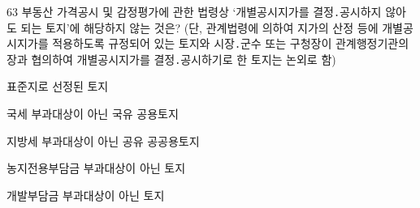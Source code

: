 \begin{question}{63}
부동산 가격공시 및 감정평가에 관한 법령상 ‘개별공시지가를 결정․공시하지 않아도 되는 토지’에 해당하지 않는 것은? (단, 관계법령에 의하여 지가의 산정 등에 개별공시지가를 적용하도록 규정되어 있는 토지와 시장․군수 또는 구청장이 관계행정기관의 장과 협의하여 개별공시지가를 결정․공시하기로 한 토지는 논외로 함)
\begin{choices}
  \item 표준지로 선정된 토지
  \item 국세 부과대상이 아닌 국유 공용토지
  \item 지방세 부과대상이 아닌 공유 공공용토지
  \item 농지전용부담금 부과대상이 아닌 토지
  \item 개발부담금 부과대상이 아닌 토지
\end{choices}
\end{question}
